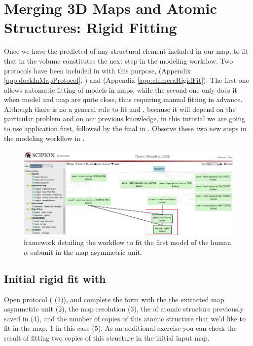 \section{Merging 3D Maps and Atomic Structures: Rigid Fitting}
Once we have the predicted  of any structural element included in our map, to fit that  in the volume constitutes the next step in the modeling workflow. Two protocols have been included in \scipion with this purpose,  (Appendix \ref{app:dockInMapProtocol}, \citep{Liebschner2019}) and  (Appendix \ref{app:chimeraRigidFit}). The first one allows automatic fitting of models in maps, while the second one only does it when model and map are quite close, thus requiring manual fitting in advance. Although there is no a general rule to fit  and , because it will depend on the particular problem and on our previous knowledge, in this tutorial we are going to use \phenix {} application first, followed by the final  in \chimera {}. Observe these two new steps in the modeling \scipion workflow in .

 \begin{figure}[H]
  \centering 
  \captionsetup{width=.9\linewidth} 
  \includegraphics[width=1\textwidth]{Images/Fig67}
  \caption{\scipion framework detailing the workflow to fit the first model of the human  $\alpha$ subunit in the map asymmetric unit.}
  \label{fig:scipion_workflow_rigidfit}
  \end{figure}

\subsection*{Initial rigid fit with \phenix {}}
 Open  protocol ( (1)), and complete the form with the the extracted map asymmetric unit (2), the map resolution (3), the  of atomic structure previously saved in \chimera (4),  and the number of copies of this atomic structure that we'd like to fit in the map, 1 in this case (5). As an additional exercise you can check the result of fitting two copies of this structure in the initial input map.
 
